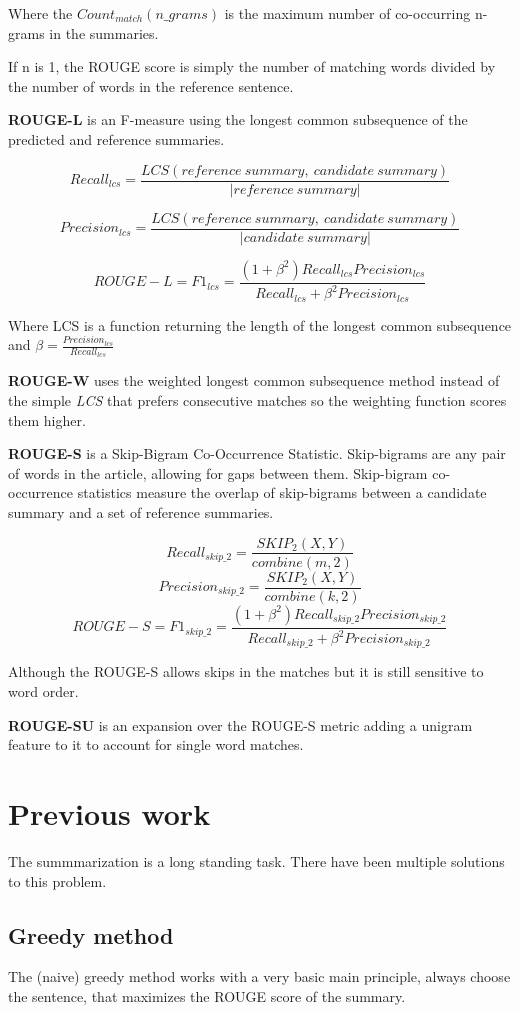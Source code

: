 Where the \(Count_{match}(n\_grams)\) is the maximum number of co-occurring n-grams in the summaries.

If n is 1, the ROUGE score is simply the number of matching words divided by the number of words in the reference sentence.

\textbf{ROUGE-L} is an F-measure using the longest common subsequence of the predicted and reference summaries.

\[Recall_{lcs} = \frac{LCS(reference\ summary,\ candidate\ summary)}{|reference\ summary|}\]

\[Precision_{lcs} = \frac{LCS(reference\ summary,\ candidate\ summary)}{|candidate\ summary|}\]

\[ROUGE-L = F1_{lcs} = \frac{(1 + \beta^2)Recall_{lcs}Precision_{lcs}}{Recall_{lcs} + \beta^2Precision_{lcs}}\]

Where LCS is a function returning the length of the longest common subsequence and \(\beta = \frac{Precision_{lcs}}{Recall_{lcs}}\)

\textbf{ROUGE-W} uses the weighted longest common subsequence method instead of the simple \textit{LCS} that prefers consecutive matches so the weighting function scores them higher.

\textbf{ROUGE-S} is a Skip-Bigram Co-Occurrence Statistic. Skip-bigrams are any pair of words in the article, allowing for gaps between them. Skip-bigram co-occurrence statistics measure the overlap of skip-bigrams between a candidate summary and a set of reference summaries.

\[Recall_{skip\_2} = \frac{SKIP_2(X, Y)}{combine(m, 2)}\]
\[Precision_{skip\_2} = \frac{SKIP_2(X, Y)}{combine(k, 2)}\]
\[ROUGE-S = F1_{skip\_2} = \frac{(1 + \beta^2)Recall_{skip\_2}Precision_{skip\_2}}{Recall_{skip\_2} + \beta^2Precision_{skip\_2}}\]

Although the ROUGE-S allows skips in the matches but it is still sensitive to word order.

\textbf{ROUGE-SU} is an expansion over the ROUGE-S metric adding a unigram feature to it to account for single word matches.

\section{Previous work}
The summmarization is a long standing task. There have been multiple solutions to this problem.

\subsection{Greedy method}
The (naive) greedy method works with a very basic main principle, always choose the sentence, that maximizes the ROUGE score of the summary.

